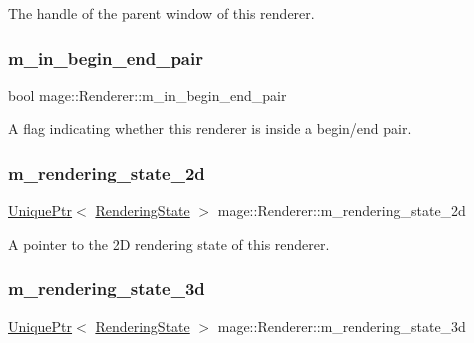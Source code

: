 The handle of the parent window of this renderer. \hypertarget{classmage_1_1_renderer_a3caa1bad6cbfde8f87f807e5c97924e3}{}\label{classmage_1_1_renderer_a3caa1bad6cbfde8f87f807e5c97924e3} 
\subsubsection{\texorpdfstring{m\+\_\+in\+\_\+begin\+\_\+end\+\_\+pair}{m\_in\_begin\_end\_pair}}
{\footnotesize\ttfamily bool mage\+::\+Renderer\+::m\+\_\+in\+\_\+begin\+\_\+end\+\_\+pair\hspace{0.3cm}{\ttfamily [private]}}

A flag indicating whether this renderer is inside a begin/end pair. \hypertarget{classmage_1_1_renderer_ab55bf9fc3a357358d07419ec25dbe510}{}\label{classmage_1_1_renderer_ab55bf9fc3a357358d07419ec25dbe510} 
\subsubsection{\texorpdfstring{m\+\_\+rendering\+\_\+state\+\_\+2d}{m\_rendering\_state\_2d}}
{\footnotesize\ttfamily \hyperlink{namespacemage_a8c307fbcc33bce9b7f2aa4c26c3b95cf}{Unique\+Ptr}$<$ \hyperlink{structmage_1_1_rendering_state}{Rendering\+State} $>$ mage\+::\+Renderer\+::m\+\_\+rendering\+\_\+state\+\_\+2d\hspace{0.3cm}{\ttfamily [private]}}

A pointer to the 2D rendering state of this renderer. \hypertarget{classmage_1_1_renderer_adf94d97911e24a3f712b294967666014}{}\label{classmage_1_1_renderer_adf94d97911e24a3f712b294967666014} 
\subsubsection{\texorpdfstring{m\+\_\+rendering\+\_\+state\+\_\+3d}{m\_rendering\_state\_3d}}
{\footnotesize\ttfamily \hyperlink{namespacemage_a8c307fbcc33bce9b7f2aa4c26c3b95cf}{Unique\+Ptr}$<$ \hyperlink{structmage_1_1_rendering_state}{Rendering\+State} $>$ mage\+::\+Renderer\+::m\+\_\+rendering\+\_\+state\+\_\+3d\hspace{0.3cm}{\ttfamily [private]}}

